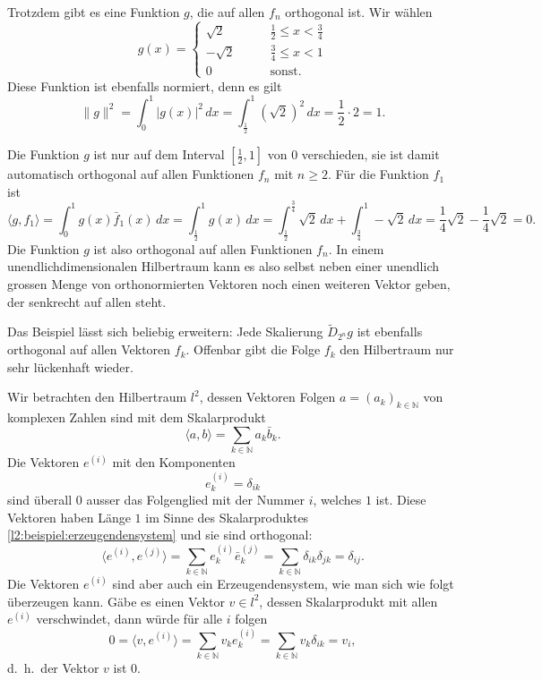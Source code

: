 \begin{beispiel}
Trotzdem gibt es eine Funktion $g$, die auf allen $f_n$ orthogonal ist.
Wir wählen
\[
g(x) = \begin{cases}
\sqrt{2}&\qquad \frac12 \le x < \frac34\\
-\sqrt{2}&\qquad \frac34 \le x < 1\\
0&\qquad\text{sonst.}
\end{cases}
\]
Diese Funktion ist ebenfalls normiert, denn es gilt
\[
\|g\|^2
=
\int_0^1 |g(x)|^2 \,dx
=
\int_{\frac12}^1 (\sqrt{2})^2\,dx
=
\frac12\cdot 2 = 1.
\]

Die Funktion $g$ ist nur auf dem Interval $[\frac12,1]$ von $0$ verschieden,
sie ist damit automatisch orthogonal auf allen Funktionen $f_n$ mit $n\ge 2$.
Für die Funktion $f_1$ ist
\[
\langle g,f_1\rangle
=
\int_0^1 g(x)\bar{f}_1(x)\,dx
=
\int_{\frac12}^1 g(x)\,dx
=
\int_{\frac12}^{\frac34}\sqrt{2}\,dx
+
\int_{\frac34}^1-\sqrt{2}\,dx
=
\frac14 \sqrt{2} - \frac14 \sqrt{2} = 0.
\]
Die Funktion $g$ ist also orthogonal auf allen Funktionen $f_n$.
In einem unendlichdimensionalen Hilbertraum kann es also selbst
neben einer unendlich grossen Menge von orthonormierten Vektoren 
noch einen weiteren Vektor geben, der senkrecht auf allen steht.
\end{beispiel}

Das Beispiel lässt sich beliebig erweitern: Jede Skalierung
$\tilde{D}_{2^n}g$ ist ebenfalls orthogonal auf allen Vektoren $f_k$.
Offenbar gibt die Folge $f_k$ den Hilbertraum nur sehr lückenhaft wieder.

\begin{beispiel}
Wir betrachten den Hilbertraum $l^2$, dessen Vektoren Folgen
$a=(a_k)_{k\in\mathbb N}$ von komplexen Zahlen sind mit dem Skalarprodukt
\begin{equation}
\langle a,b\rangle = \sum_{k\in\mathbb N} a_k\bar{b}_k.
\label{l2:beispiel:erzeugendensystem}
\end{equation}
Die Vektoren $e^{(i)}$ mit den Komponenten
\[
e^{(i)}_k = \delta_{ik}
\]
sind überall $0$ ausser das Folgenglied mit der Nummer $i$, welches $1$
ist. 
Diese Vektoren haben Länge $1$ im Sinne des Skalarproduktes
\eqref{l2:beispiel:erzeugendensystem} und sie sind orthogonal:
\[
\langle e^{(i)}, e^{(j)}\rangle
=
\sum_{k\in\mathbb N} e^{(i)}_k\bar{e}^{(j)}_k
=
\sum_{k\in\mathbb N} \delta_{ik}\delta_{jk}
=
\delta_{ij}.
\]
Die Vektoren $e^{(i)}$ sind aber auch ein Erzeugendensystem, wie man sich
wie folgt überzeugen kann.
Gäbe es einen Vektor $v\in l^2$, dessen Skalarprodukt mit allen $e^{(i)}$
verschwindet, dann würde für alle $i$ folgen
\[
0
=
\langle v,e^{(i)}\rangle
=
\sum_{k\in\mathbb N} v_ke^{(i)}_k
=
\sum_{k\in\mathbb N} v_k\delta_{ik}
=
v_i,
\]
d.~h.~der Vektor $v$ ist $0$.
\end{beispiel}

